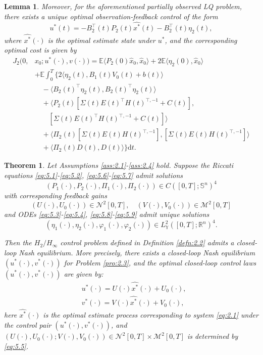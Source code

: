 \documentclass[10pt,a4paper]{amsart}
\newtheorem{lem}{Lemma}
\newtheorem{thm}{Theorem}
\begin{document}
\begin{lem}
	Moreover, for the aforementioned partially observed LQ problem, there exists a unique optimal observation-feedback control of the form 
	\[
	u^*(t) = -B_2^{\top}(t)P_2(t)\widehat{x^*}(t) - B_2^{\top}(t)\eta_2(t),
	\]
	where $\widehat{x^*}(\cdot)$ is the optimal estimate state under $u^*$,
	and the corresponding optimal cost is given by
	\begin{equation}\label{eq:5.12}
		\begin{aligned}
			J_2(0,&x_0;u^*(\cdot),v(\cdot)) = \mathbb{E} \langle P_2(0)\widehat{x}_0,\widehat{x}_0 \rangle + 2\mathbb{E}\langle \eta_2(0),\widehat{x}_0 \rangle\\
			&+ \mathbb{E}\int_0^T \Big\{ 2\langle \eta_2(t),B_1(t)V_0(t) + b(t) \rangle \\
			&\quad - \langle B_2(t)^\top \eta_2(t),B_2(t)^\top \eta_2(t) \rangle\\
			&\quad + \langle P_2(t)[\Sigma(t) E(t)^\top H(t)^{\top,-1} + C(t)],\\
			&\qquad [\Sigma(t)E(t)^\top H(t)^{\top,-1} + C(t)] \rangle\\
			&\quad +\langle\Pi_2(t)[\Sigma(t)E(t)H(t)^{\top,-1}],[\Sigma(t)E(t)H(t)^{\top,-1}]\rangle \\
			&\quad + \langle\Pi_2(t)D(t),D(t)\rangle \Big\} \mathrm{d}t.
		\end{aligned}
	\end{equation}
\end{lem}

\begin{thm}\label{thm:5.3}
	Let Assumptions \ref{ass:2.1}-\ref{ass:2.4} hold. Suppose the Riccati equations \eqref{eq:5.1}-\eqref{eq:5.2}, \eqref{eq:5.6}-\eqref{eq:5.7} admit solutions 
	\[
	(P_1(\cdot), P_2(\cdot), \Pi_1(\cdot), \Pi_2(\cdot)) \in C([0,T];\mathbb{S}^n)^4
	\]
	with corresponding feedback gains
	\[
	(U(\cdot),U_0(\cdot)) \in \mathcal{N}^2[0,T], \quad (V(\cdot),V_0(\cdot)) \in \mathcal{M}^2[0,T]
	\]
	and ODEs \eqref{eq:5.3}-\eqref{eq:5.4}, \eqref{eq:5.8}-\eqref{eq:5.9} admit unique solutions 
	\[
	(\eta_1(\cdot), \eta_2(\cdot), \varphi_1(\cdot), \varphi_2(\cdot)) \in L_{\mathbb{Y}}^2([0,T];\mathbb{R}^n)^4.
	\]
	
	Then the $H_2/H_\infty$ control problem defined in Definition \ref{defn:2.2} admits a closed-loop Nash equilibrium. More precisely, there exists a closed-loop Nash equilibrium $(u^*(\cdot),v^*(\cdot))$ for Problem \ref{pro:2.3}, and the optimal closed-loop control laws $(u^*(\cdot),v^*(\cdot))$ are given by:
	\begin{equation*}
		\begin{aligned}
			&u^*(\cdot) = U(\cdot)\widehat{x^*}(\cdot) + U_0(\cdot),\\
			&v^*(\cdot) = V(\cdot)\widehat{x^*}(\cdot) + V_0(\cdot),
		\end{aligned}
	\end{equation*}
	here $\widehat{x^*}(\cdot)$ is the optimal estimate process corresponding to system \eqref{eq:2.1} under the control pair $(u^*(\cdot),v^*(\cdot))$, and $(U(\cdot),U_0(\cdot);V(\cdot),V_0(\cdot)) \in \mathcal{N}^2[0,T] \times \mathcal{M}^2[0,T] $ is determined by \eqref{eq:5.5}.
\end{thm}
\end{document}
